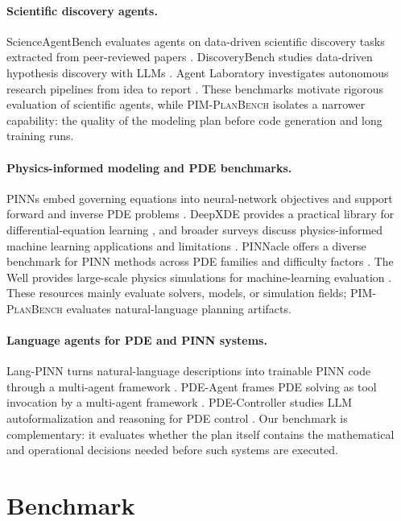 \documentclass[11pt]{article}
\newcommand{\pimplanbench}{\textsc{PIM-PlanBench}}
\begin{document}
\paragraph{Scientific discovery agents.}
ScienceAgentBench evaluates agents on data-driven scientific discovery tasks extracted from peer-reviewed papers \citep{scienceagentbench2025}. DiscoveryBench studies data-driven hypothesis discovery with LLMs \citep{discoverybench2024}. Agent Laboratory investigates autonomous research pipelines from idea to report \citep{agentlaboratory2025}. These benchmarks motivate rigorous evaluation of scientific agents, while \pimplanbench{} isolates a narrower capability: the quality of the modeling plan before code generation and long training runs.

\paragraph{Physics-informed modeling and PDE benchmarks.}
PINNs embed governing equations into neural-network objectives and support forward and inverse PDE problems \citep{raissi2019pinn}. DeepXDE provides a practical library for differential-equation learning \citep{lu2021deepxde}, and broader surveys discuss physics-informed machine learning applications and limitations \citep{karniadakis2021physics}. PINNacle offers a diverse benchmark for PINN methods across PDE families and difficulty factors \citep{pinnacle2024}. The Well provides large-scale physics simulations for machine-learning evaluation \citep{thewell2024}. These resources mainly evaluate solvers, models, or simulation fields; \pimplanbench{} evaluates natural-language planning artifacts.

\paragraph{Language agents for PDE and PINN systems.}
Lang-PINN turns natural-language descriptions into trainable PINN code through a multi-agent framework \citep{langpinn2025}. PDE-Agent frames PDE solving as tool invocation by a multi-agent framework \citep{pdeagent2025}. PDE-Controller studies LLM autoformalization and reasoning for PDE control \citep{pdecontroller2025}. Our benchmark is complementary: it evaluates whether the plan itself contains the mathematical and operational decisions needed before such systems are executed.

\section{Benchmark}
\end{document}
